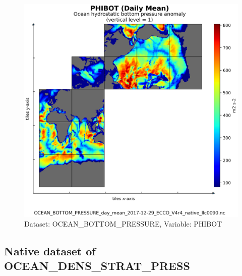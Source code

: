 \begin{figure}[H]
\centering
\includegraphics[scale=0.55]{../images/plots/native_plots/Ocean_Bottom_Pressure/PHIBOT.png}
\caption{Dataset: OCEAN\_BOTTOM\_PRESSURE, Variable: PHIBOT}
\label{tab:table-OCEAN_BOTTOM_PRESSURE_PHIBOT-Plot}
\end{figure}
\newpage
\subsection{Native dataset of OCEAN\_DENS\_STRAT\_PRESS}
\newp

